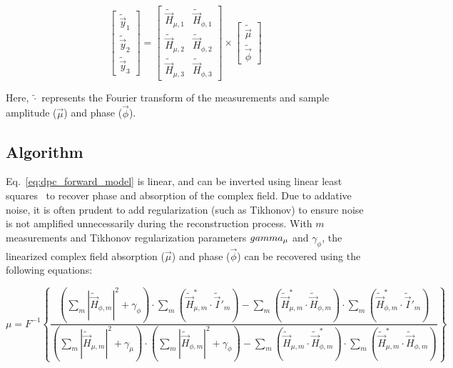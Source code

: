 \begin{equation}
    \label{eq:dpc_forward_model}
    \begin{bmatrix}\tilde{\vec{y}}_1 \\ \tilde{\vec{y}}_2 \\ \tilde{\vec{y}}_3\end{bmatrix} = \begin{bmatrix}\tilde{\vec{H}}_{\mu, 1} & \tilde{\vec{H}}_{\phi, 1}\\ \tilde{\vec{H}}_{\mu, 2} & \tilde{\vec{H}}_{\phi, 2} \\ \tilde{\vec{H}}_{\mu, 3} & \tilde{\vec{H}}_{\phi, 3}\end{bmatrix} \times \begin{bmatrix}\tilde{\vec{\mu}} \\ \tilde{\vec{\phi}}\end{bmatrix}
\end{equation}

\noindent Here, $\tilde{\cdot}$ represents the Fourier transform of the measurements and sample amplitude ($\vec{\mu}$) and phase ($\vec{\phi}$).

\subsection{Algorithm}
Eq.~\ref{eq:dpc_forward_model} is linear, and can be inverted using linear least squares~\cite{tian2015quantitative} to recover phase and absorption of the complex field. Due to addative noise, it is often prudent to add regularization (such as Tikhonov) to ensure noise is not amplified unnecessarily during the reconstruction process. With $m$ measurements and Tikhonov regularization parameters $\\gamma_{\mu}$ and $\gamma_{\phi}$, the linearized complex field absorption ($\vec{\mu}$) and phase ($\vec{\phi}$) can be recovered using the following equations:

\begin{equation} \label{eq:Ha_inverse}
\mu = F^{-1}\left\{\frac{\left(\sum\limits_{m}|\tilde{\vec{H}}_{\phi,m}|^2+\gamma_{\phi}\right)\cdot\sum\limits_{m}\left(\tilde{\vec{H}}^*_{\mu,m}\cdot\tilde{\vec{I}}'_{m}\right)-\sum\limits_{m} \left ( \tilde{\vec{H}}^*_{\mu,m}\cdot\tilde{\vec{H}}_{\phi,m} \right ) \cdot\sum\limits_{m}\left(\tilde{\vec{H}}^*_{\phi,m}\cdot\tilde{\vec{I}}'_{m}\right)}{\left(\sum\limits_{m}|\tilde{\vec{H}}_{\mu,m}|^2+\gamma_{\mu}\right)\cdot\left(\sum\limits_{m}|\tilde{\vec{H}}_{\phi,m}|^2+\gamma_{\phi}\right) - \sum\limits_{m}\left(\tilde{\vec{H}}_{\mu,m}\cdot\tilde{\vec{H}}^*_{\phi,m}\right)\cdot\sum\limits_{m}\left(\tilde{\vec{H}}^*_{\mu,m}\cdot\tilde{\vec{H}}_{\phi,m}\right)} \right\}
\end{equation}

